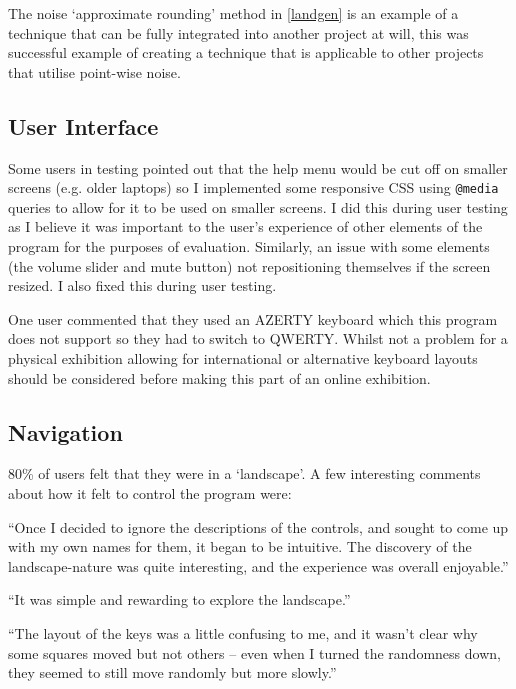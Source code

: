 The noise `approximate rounding' method in \autoref{landgen} is an example of a
technique that can be fully integrated into another project at will, this was
successful example of creating a technique that is applicable to other projects
that utilise point-wise noise.

\subsection{User Interface}
Some users in testing pointed out that the help menu would be cut off on smaller
screens (e.g. older laptops) so I implemented some responsive CSS using
\verb|@media| queries to allow for it to be used on smaller screens. I did this
during user testing as I believe it was important to the user's experience of
other elements of the program for the purposes of evaluation. Similarly, an
issue with some elements (the volume slider and mute button) not repositioning
themselves if the screen resized. I also fixed this during user testing.

One user commented that they used an AZERTY keyboard which this program does not
support so they had to switch to QWERTY. Whilst not a problem for a physical
exhibition allowing for international or alternative keyboard layouts should be
considered before making this part of an online exhibition.

\subsection{Navigation}
80\% of users felt that they were in a `landscape'. A few interesting comments
about how it felt to control the program were:

\begin{displayquote}
``Once I decided to ignore the descriptions of the controls, and sought to come
up with my own names for them, it began to be intuitive. The discovery of the
landscape-nature was quite interesting, and the experience was overall
enjoyable.''
\end{displayquote}

\begin{displayquote}
``It was simple and rewarding to explore the landscape.''
\end{displayquote}

\begin{displayquote}
``The layout of the keys was a little confusing to me, and it wasn't clear why
some squares moved but not others -- even when I turned the randomness down,
they seemed to still move randomly but more slowly.''
\end{displayquote}

